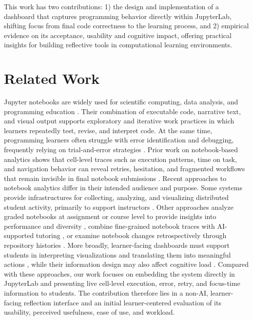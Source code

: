 \documentclass[sigconf]{acmart}
\begin{document}
This work has two contributions: 1) the design and implementation of a dashboard that captures programming behavior directly within JupyterLab, shifting focus from final code correctness to the learning process, and 2) empirical evidence on its acceptance, usability and cognitive impact, offering practical insights for building reflective tools in computational learning environments.


\section{Related Work}
Jupyter notebooks are widely used for scientific computing, data analysis, and programming education \cite{perkel2018jupyter}. Their combination of executable code, narrative text, and visual output supports exploratory and iterative work practices in which learners repeatedly test, revise, and interpret code. At the same time, programming learners often struggle with error identification and debugging, frequently relying on trial-and-error strategies \cite{robinson2022error}. Prior work on notebook-based analytics shows that cell-level traces such as execution patterns, time on task, and navigation behavior can reveal retries, hesitation, and fragmented workflows that remain invisible in final notebook submissions \cite{cai2025jupyter,JELAI}. Recent approaches to notebook analytics differ in their intended audience and purpose. Some systems provide infrastructures for collecting, analyzing, and visualizing distributed student activity, primarily to support instructors \cite{cai2025jupyter}. Other approaches analyze graded notebooks at assignment or course level to provide insights into performance and diversity \cite{groher2024learning}, combine fine-grained notebook traces with AI-supported tutoring \cite{JELAI}, or examine notebook changes retrospectively through repository histories \cite{raghunandan2023code}. More broadly, learner-facing dashboards must support students in interpreting visualizations and translating them into meaningful actions \cite{jivet2020students}, while their information design may also affect cognitive load \cite{cheng2024influence}. Compared with these approaches, our work focuses on embedding the system directly in JupyterLab and presenting live cell-level execution, error, retry, and focus-time information to students. The contribution therefore lies in a non-AI, learner-facing reflection interface and an initial learner-centered evaluation of its usability, perceived usefulness, ease of use, and workload.
\end{document}
